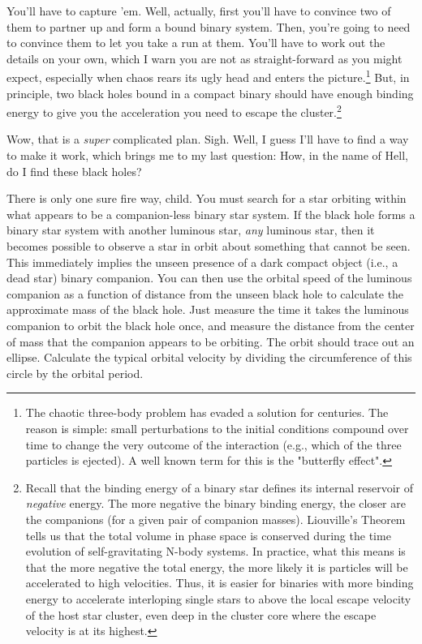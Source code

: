\documentclass[main.tex]{subfiles}
\begin{document}
\par \Enrico You'll have to capture 'em.  Well, actually, first you'll have to convince two of them to partner up and form a bound binary system.  Then, you're going to need to convince them to let you take a run at them.  You'll have to work out the details on your own, which I warn you are not as straight-forward as you might expect, especially when chaos rears its ugly head and enters the picture.\footnote{The chaotic three-body problem has evaded a solution for centuries.  The reason is simple:  small perturbations to the initial conditions compound over time to change the very outcome of the interaction (e.g., which of the three particles is ejected).  A well known term for this is the "butterfly effect".}  But, in principle, two black holes bound in a compact binary should have enough binding energy to give you the acceleration you need to escape the cluster.\footnote{Recall that the binding energy of a binary star defines its internal reservoir of \textit{negative} energy.  The more negative the binary binding energy, the closer are the companions (for a given pair of companion masses).  Liouville's Theorem tells us that the total volume in phase space is conserved during the time evolution of self-gravitating N-body systems.  In practice, what this means is that the more negative the total energy, the more likely it is particles will be accelerated to high velocities.  Thus, it is easier for binaries with more binding energy to accelerate interloping single stars to above the local escape velocity of the host star cluster, even deep in the cluster core where the escape velocity is at its highest.}    

\par \Sterope Wow, that is a \textit{super} complicated plan.  Sigh.  Well, I guess I'll have to find a way to make it work, which brings me to my last question:  How, in the name of Hell, do I find these black holes?

\par \Enrico There is only one sure fire way, child.  You must search for a star orbiting within what appears to be a companion-less binary star system.  If the black hole forms a binary star system with another luminous star, \textit{any} luminous star, then it becomes possible to observe a star in orbit about something that cannot be seen.  This immediately implies the unseen presence of a dark compact object (i.e., a dead star) binary companion.  You can then use the orbital speed of the luminous companion as a function of distance from the unseen black hole to calculate the approximate mass of the black hole.  Just measure the time it takes the luminous companion to orbit the black hole once, and measure the distance from the center of mass that the companion appears to be orbiting.  The orbit should trace out an ellipse.  Calculate the typical orbital velocity by dividing the circumference of this circle by the orbital period.
\end{document}
